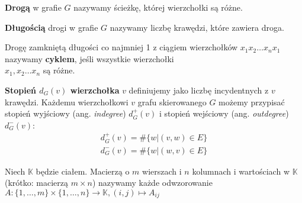 \begin{definicja}[Droga]\label{def:droga}
\textbf{Drogą} w grafie \(G\) nazywamy ścieżkę, której wierzchołki są różne.
\end{definicja}

\begin{definicja}\label{def:dlugosc_drogi}
\textbf{Długością} drogi w grafie \(G\) nazywamy liczbę krawędzi, które zawiera droga.
\end{definicja}
\begin{definicja}[Cykl]\label{def:cykl_w_grafie}
Drogę zamkniętą długości co najmniej 1 z ciągiem wierzchołków \(x_1 x_2\dots x_n x_1\) nazywamy \textbf{cyklem}, jeśli wszystkie wierzchołki\\ \(x_1, x_2\dots x_n\) są różne.
\end{definicja}

\begin{definicja}\label{def:stopien_node}
\textbf{Stopień \(d_{G}(v)\) wierzchołka} \(v\) definiujemy jako liczbę incydentnych z \(v\) krawędzi. Każdemu wierzchołkowi \(v\) grafu skierowanego \(G\) możemy przypisać stopień wyjściowy (ang. \emph{indegree}) \(d_{G}^{+}(v)\) i stopień wejściowy (ang. \emph{outdegree}) \(d_{G}^{-}(v)\):
\begin{align*}
 d_{G}^{+}(v) = \#\{w|(v,w)\in E\}\\ 
 d_{G}^{-}(v) = \#\{w|(w,v)\in E\}
\end{align*}
\end{definicja}

\begin{definicja}[Macierz]\label{def:matrix}
Niech \(\mathbb{K}\) będzie ciałem. Macierzą o \(m\) wierszach i \(n\) kolumnach i wartościach w \(\mathbb{K}\) (krótko: macierzą \(m\times n\)) nazywamy każde odwzorowanie \(A:\{1,\dots, m\}\times \{1, \dots, n\}\xrightarrow{} \mathbb{K}, (i,j)\longmapsto A_{ij}\)
\end{definicja}